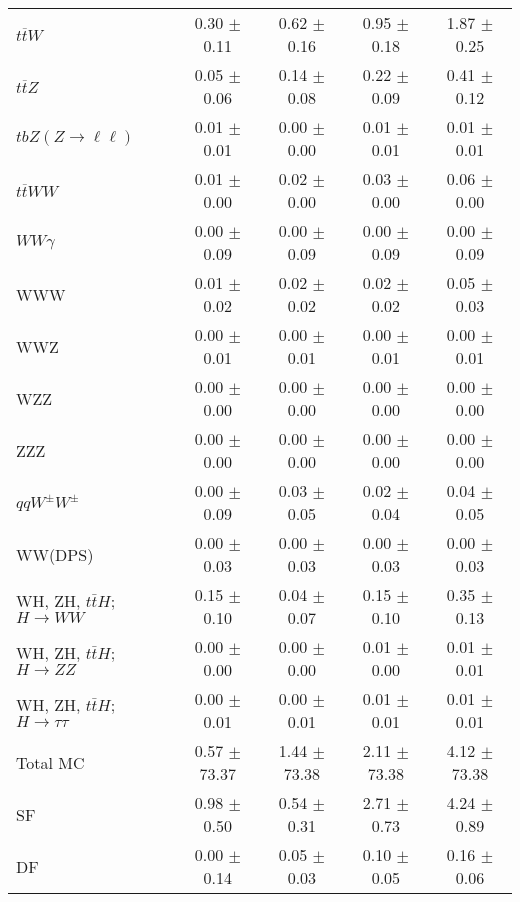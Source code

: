 \begin{tabular}{l|cccc}
                   $t\overline{t}W$ &  0.30 $\pm$  0.11 &  0.62 $\pm$  0.16 &  0.95 $\pm$  0.18 &  1.87 $\pm$  0.25 \\
                   $t\overline{t}Z$ &  0.05 $\pm$  0.06 &  0.14 $\pm$  0.08 &  0.22 $\pm$  0.09 &  0.41 $\pm$  0.12 \\
    $tbZ (Z \rightarrow \ell \ell)$ &  0.01 $\pm$  0.01 &  0.00 $\pm$  0.00 &  0.01 $\pm$  0.01 &  0.01 $\pm$  0.01 \\
                  $t\overline{t}WW$ &  0.01 $\pm$  0.00 &  0.02 $\pm$  0.00 &  0.03 $\pm$  0.00 &  0.06 $\pm$  0.00 \\
                         $WW\gamma$ &  0.00 $\pm$  0.09 &  0.00 $\pm$  0.09 &  0.00 $\pm$  0.09 &  0.00 $\pm$  0.09 \\
                                WWW &  0.01 $\pm$  0.02 &  0.02 $\pm$  0.02 &  0.02 $\pm$  0.02 &  0.05 $\pm$  0.03 \\
                                WWZ &  0.00 $\pm$  0.01 &  0.00 $\pm$  0.01 &  0.00 $\pm$  0.01 &  0.00 $\pm$  0.01 \\
                                WZZ &  0.00 $\pm$  0.00 &  0.00 $\pm$  0.00 &  0.00 $\pm$  0.00 &  0.00 $\pm$  0.00 \\
                                ZZZ &  0.00 $\pm$  0.00 &  0.00 $\pm$  0.00 &  0.00 $\pm$  0.00 &  0.00 $\pm$  0.00 \\
                 $qqW^{\pm}W^{\pm}$ &  0.00 $\pm$  0.09 &  0.03 $\pm$  0.05 &  0.02 $\pm$  0.04 &  0.04 $\pm$  0.05 \\
                            WW(DPS) &  0.00 $\pm$  0.03 &  0.00 $\pm$  0.03 &  0.00 $\pm$  0.03 &  0.00 $\pm$  0.03 \\
WH, ZH, $t\bar{t}H$; $H \rightarrow WW$ &  0.15 $\pm$  0.10 &  0.04 $\pm$  0.07 &  0.15 $\pm$  0.10 &  0.35 $\pm$  0.13 \\
WH, ZH, $t\bar{t}H$; $H \rightarrow ZZ$ &  0.00 $\pm$  0.00 &  0.00 $\pm$  0.00 &  0.01 $\pm$  0.00 &  0.01 $\pm$  0.01 \\
WH, ZH, $t\bar{t}H$; $H \rightarrow \tau\tau$ &  0.00 $\pm$  0.01 &  0.00 $\pm$  0.01 &  0.01 $\pm$  0.01 &  0.01 $\pm$  0.01 \\
\hline\hline
                           Total MC &  0.57 $\pm$ 73.37 &  1.44 $\pm$ 73.38 &  2.11 $\pm$ 73.38 &  4.12 $\pm$ 73.38 \\
\hline
                                 SF &  0.98 $\pm$  0.50 &  0.54 $\pm$  0.31 &  2.71 $\pm$  0.73 &  4.24 $\pm$  0.89 \\
                                 DF &  0.00 $\pm$  0.14 &  0.05 $\pm$  0.03 &  0.10 $\pm$  0.05 &  0.16 $\pm$  0.06 \\

\end{tabular}

